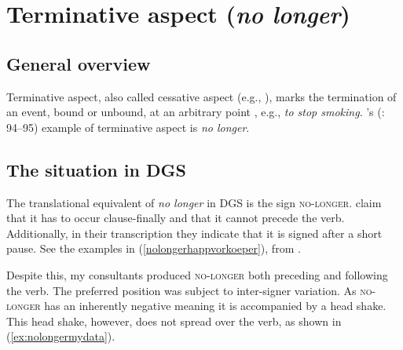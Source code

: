 
\section{Terminative aspect (\textit{no longer})}
\subsection{General overview}
Terminative aspect, also called cessative aspect (e.g., \citealt{binnick1991time}), marks the termination of an event, bound or unbound, at an arbitrary point \citep[70]{cinque2006restructuring}, e.g., \textit{to stop smoking}. \citeauthor{cinque1999adverbs}'s (\citeyear{cinque1999adverbs}: 94--95) example of terminative aspect is \textit{no longer}. 

\subsection{The situation in DGS}
The translational equivalent of \textit{no longer} in DGS is the sign \textsc{no-longer}. \citet[377]{happ2014vork} claim that it has to occur clause-finally and that it cannot precede the verb. Additionally, in their transcription they indicate that it is signed after a short pause. See the examples in (\ref{nolongerhappvorkoeper}), from \citet[377]{happ2014vork}. 


\begin{exe}
\ex\label{nolongerhappvorkoeper}\begin{xlist} 
\end{xlist}

\end{exe} 


\noindent Despite this, my consultants produced \textsc{no-longer} both preceding and following the verb. The preferred position was subject to inter-signer variation. As \textsc{no-longer} has an inherently negative meaning it is accompanied by a head shake. This head shake, however, does not spread over the verb, as shown in (\ref{ex:nolongermydata}).


